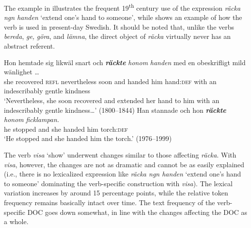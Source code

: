 \documentclass[output=paper]{langscibook}
\begin{document}
The example in  illustrates the frequent 19\textsuperscript{th} century use of the expression \textit{räcka ngn handen} ‘extend one's hand to someone’, while  shows an example of how the verb is used in present-day Swedish. It should be noted that, unlike the verbs \textit{bereda}, \textit{ge,} \textit{göra}, and \textit{lämna}, the direct object of \textit{räcka} virtually never has an abstract referent.


\ea \label{ex:valdeson:16}
\gll Hon hemtade   sig     likwäl        snart  och \textbf{\textit{räckte}} \textit{honom}  \textit{handen} med  en  obeskrifligt    mild    wänlighet …\\
  she  recovered  \textsc{refl}  nevertheless    soon  and  handed him   hand\textsc{:def} with  an  indescribably  gentle  kindness\\
\glt ‘Nevertheless, she soon recovered and extended her hand to him with an indescribably gentle kindness…’ (1800–1844)
\ex \label{ex:valdeson:17}
\gll Han  stannade och  hon \textbf{\textit{räckte}} \textit{honom}      \textit{ficklampan.}\\
  he        stopped  and   she handed him         torch:\textsc{def}\\
\glt `He stopped and she handed him the torch.’ (1976–1999)
\z


\label{sec:valdeson:5.3.2.2}



The verb \textit{visa} ‘show’ underwent changes similar to those affecting \textit{räcka}. With \textit{visa}, however, the changes are not as dramatic and cannot be as easily explained (i.e., there is no lexicalized expression like \textit{räcka ngn handen} ‘extend one's hand to someone’ dominating the verb-specific construction with \textit{visa}). The lexical variation increases by around 15 percentage points, while the relative token frequency remains basically intact over time. The text frequency of the verb-specific DOC goes down somewhat, in line with the changes affecting the DOC as a whole.


\begin{table}
\caption{Frequency measures of the verb-specific DOC with \textit{visa} ‘show’}
\label{tab:valdeson:13}
\end{table}
\end{document}
